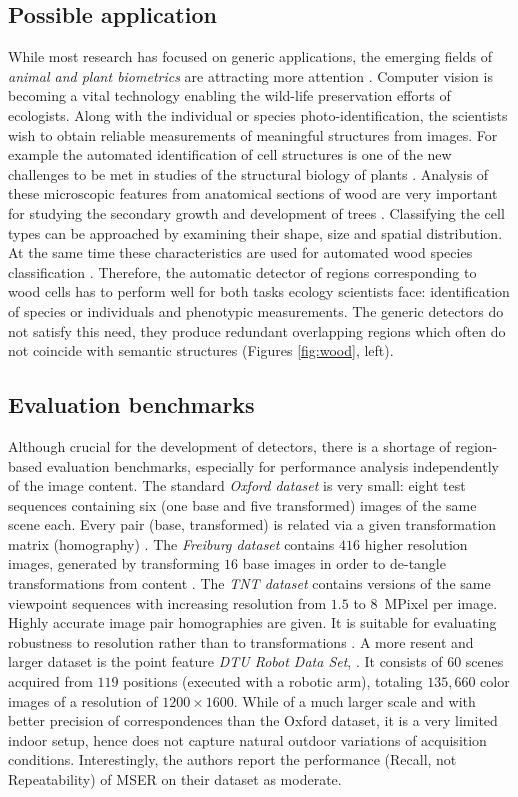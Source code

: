 \documentclass[conference,compsoc]{IEEEtran}
\begin{document}
\subsection{Possible application}
While most research has focused on generic applications, the emerging fields of {\em animal and plant biometrics} are attracting more attention \cite{Kuehl2013, leafsnap_eccv2012}. Computer vision is becoming a vital technology enabling the wild-life preservation efforts of ecologists. Along with the individual or species photo-identification, the scientists wish to obtain reliable measurements of meaningful structures from images. For example the automated identification of cell structures is one of the new challenges to be met in studies of the structural biology of plants \cite{Quelhas2011}. Analysis of these microscopic features from anatomical sections of wood are very important for studying the secondary growth and development of trees \cite{Brunel2014}. Classifying the cell types can be approached by examining their shape, size and spatial distribution. At the same time these characteristics are used for automated wood species classification \cite{Gasson2011}. Therefore, the  automatic detector of regions corresponding to wood cells has to perform well for both tasks ecology scientists face: identification of species or individuals and phenotypic measurements. The generic detectors do not satisfy this need, they produce redundant overlapping regions which often do not coincide with semantic structures (Figures \ref{fig:wood}, left).

\subsection{Evaluation benchmarks}
Although crucial for the development of detectors, there is a shortage of region-based evaluation benchmarks, especially for performance analysis independently of the image content.  The standard {\em Oxford dataset} is very small: eight test sequences containing six (one base and five transformed) images of the same scene each. Every pair (base, transformed) is related via a given transformation matrix (homography) \cite{Mikolajczyk:2005}.  The {\em Freiburg dataset} contains $416$ higher resolution images, generated by transforming $16$ base images in order to de-tangle transformations from content \cite{FischerDB14}.  
The {\em TNT dataset} contains versions of the same viewpoint sequences with increasing resolution from $1.5$ to $8$~MPixel per image. Highly accurate image pair homographies are given. It is suitable for evaluating robustness to resolution rather than to transformations \cite{CorRos2013}.  A more resent and larger dataset is the point feature {\em DTU Robot Data Set}, \cite{AanaesDP12}. It  consists of $60$ scenes acquired from $119$ positions (executed with a robotic arm), totaling $135, 660$ color images of a resolution of $1200 \times 1600$. While of a much larger scale and with better precision of correspondences than the Oxford dataset, it is a very limited indoor setup, hence does not capture natural outdoor variations of acquisition conditions. Interestingly, the authors report the performance (Recall, not Repeatability) of MSER on their dataset as moderate. 
\end{document}
